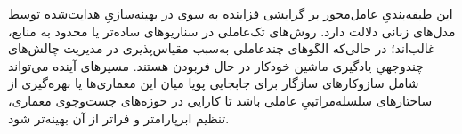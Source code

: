 این طبقه‌بندیِ عامل‌محور بر گرایشی فزاینده به سوی  در بهینه‌سازیِ هدایت‌شده توسط مدل‌های زبانی دلالت دارد. روش‌های تک‌عاملی در سناریوهای ساده‌تر یا محدود به منابع، غالب‌اند؛ در حالی‌که الگوهای چندعاملی به‌سبب مقیاس‌پذیری در مدیریت چالش‌های چندوجهیِ یادگیری ماشین خودکار در حال فربودن هستند. مسیرهای آینده می‌تواند شامل سازوکارهای سازگار برای جابجایی پویا میان این معماری‌ها یا بهره‌گیری از ساختارهای سلسله‌مراتبیِ عاملی باشد تا کارایی در حوزه‌های جست‌وجوی معماری، تنظیم ابرپارامتر و فراتر از آن بهینه‌تر شود.